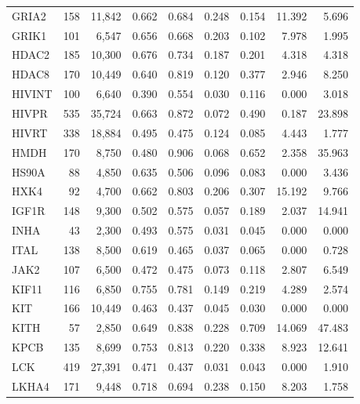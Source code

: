 \begin{center}
\begin{longtable}{lrrrrrrrr}
		GRIA2  & 158   & 11,842   & 0.662   & 0.684   & 0.248   & 0.154   & 11.392  & 5.696  \\
		GRIK1  & 101   & 6,547    & 0.656   & 0.668   & 0.203   & 0.102   & 7.978   & 1.995  \\
		HDAC2  & 185   & 10,300   & 0.676   & 0.734   & 0.187   & 0.201   & 4.318   & 4.318  \\
		HDAC8  & 170   & 10,449   & 0.640   & 0.819   & 0.120   & 0.377   & 2.946   & 8.250  \\
		HIVINT & 100   & 6,640    & 0.390   & 0.554   & 0.030   & 0.116   & 0.000   & 3.018  \\
		HIVPR  & 535   & 35,724   & 0.663   & 0.872   & 0.072   & 0.490   & 0.187   & 23.898 \\
		HIVRT  & 338   & 18,884   & 0.495   & 0.475   & 0.124   & 0.085   & 4.443   & 1.777  \\
		HMDH   & 170   & 8,750    & 0.480   & 0.906   & 0.068   & 0.652   & 2.358   & 35.963 \\
		HS90A  & 88    & 4,850    & 0.635   & 0.506   & 0.096   & 0.083   & 0.000   & 3.436  \\
		HXK4   & 92    & 4,700    & 0.662   & 0.803   & 0.206   & 0.307   & 15.192  & 9.766  \\
		IGF1R  & 148   & 9,300    & 0.502   & 0.575   & 0.057   & 0.189   & 2.037   & 14.941 \\
		INHA   & 43    & 2,300    & 0.493   & 0.575   & 0.031   & 0.045   & 0.000   & 0.000  \\
		ITAL   & 138   & 8,500    & 0.619   & 0.465   & 0.037   & 0.065   & 0.000   & 0.728  \\
		JAK2   & 107   & 6,500    & 0.472   & 0.475   & 0.073   & 0.118   & 2.807   & 6.549  \\
		KIF11  & 116   & 6,850    & 0.755   & 0.781   & 0.149   & 0.219   & 4.289   & 2.574  \\
		KIT    & 166   & 10,449   & 0.463   & 0.437   & 0.045   & 0.030   & 0.000   & 0.000  \\
		KITH   & 57    & 2,850    & 0.649   & 0.838   & 0.228   & 0.709   & 14.069  & 47.483 \\
		KPCB   & 135   & 8,699    & 0.753   & 0.813   & 0.220   & 0.338   & 8.923   & 12.641 \\
		LCK    & 419   & 27,391   & 0.471   & 0.437   & 0.031   & 0.043   & 0.000   & 1.910  \\
		LKHA4  & 171   & 9,448    & 0.718   & 0.694   & 0.238   & 0.150   & 8.203   & 1.758  \\

\end{longtable}
\end{center}
